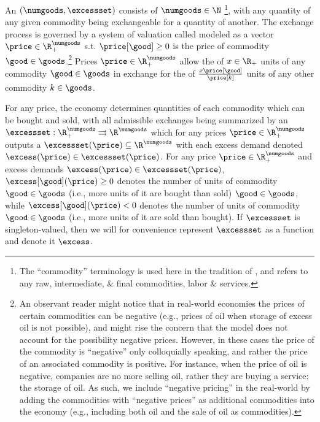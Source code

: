 


An  $(\numgoods, \excessset)$ consists of $\numgoods \in \N$ \footnote{The ``commodity'' terminology is used here in the tradition of \citet{arrow-debreu}, and refers to any raw, intermediate, \& final commodities, labor \& services. }, with any quantity of any given commodity being exchangeable for a quantity of another. 
The exchange process is governed by a system of valuation called  modeled as a vector $\price \in \R^\numgoods_+$ s.t. $\price[\good] \geq 0$ is the price of commodity $\good \in \goods$.\footnote{An observant reader might notice that in real-world economies the prices of certain commodities can be negative (e.g., prices of oil when storage of excess oil is not possible), and might rise the concern that the model does not account for the possibility negative prices. However, in these cases the price of the commodity is ``negative'' only colloquially speaking, and rather the price of an associated commodity is positive. For instance, when the price of oil is negative, companies are no more selling oil, rather they are buying a service: the storage of oil. As such, we include ``negative pricing'' in the real-world by adding the commodities with ``negative prices'' as additional commodities into the economy (e.g., including both oil and the sale of oil as commodities).} Prices $\price \in \R^\numgoods_+$ allow the  of $x \in \R_+$ units of any commodity $\good \in \goods$ in exchange for the  of $\frac{x \price[\good]}{\price[k]}$ units of any other commodity $k \in \goods$.

For any price, the economy determines quantities of each commodity which can be bought and sold, with all admissible exchanges being summarized by an  $\excessset: \R^\numgoods_+ \rightrightarrows \R^\numgoods$ which for any prices $\price \in \R^\numgoods_+$ outputs a  $\excessset(\price) \subseteq \R^\numgoods$ with each excess demand denoted $\excess(\price) \in \excessset(\price)$. For any price $\price \in \R^\numgoods_+$ and excess demands $\excess(\price) \in \excessset(\price)$, $\excess[\good](\price) \geq 0$ denotes the number of units of commodity $\good \in \goods$  (i.e., more units of it are bought than sold) $\good \in \goods$, while $\excess[\good](\price) < 0$ denotes the number of units of commodity $\good \in \goods$  (i.e., more units of it are sold than bought). If $\excessset$ is singleton-valued, then we will for convenience represent $\excessset$ as a function and denote it $\excess$. 

